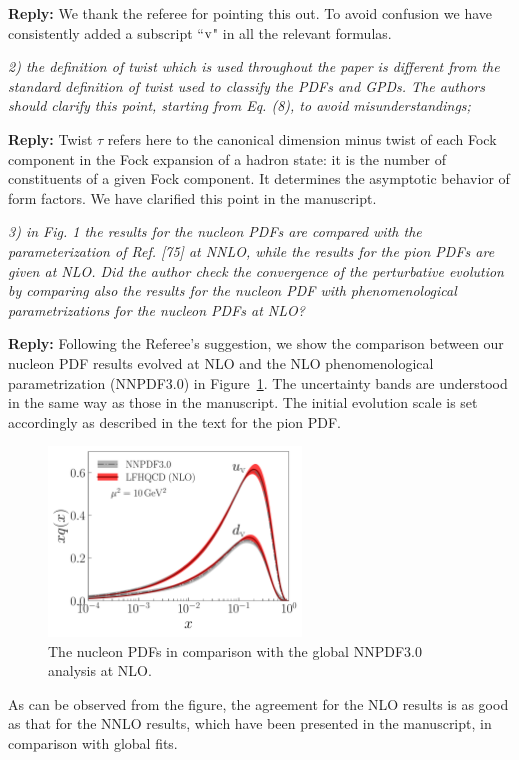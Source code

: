 \documentclass[12pt]{article}
\begin{document}
{\bf Reply:} We thank the referee for pointing this out. To avoid confusion we have consistently added a subscript  ``$\rm v$" in all the relevant formulas.


{\it 2) the definition of twist which is used throughout the paper is
different from the standard definition of twist used to classify the
PDFs and GPDs. The authors should clarify this point, starting from
Eq. (8), to avoid misunderstandings;}


{\bf Reply:}  Twist $\tau$ refers here to the canonical dimension minus twist of each Fock component in the Fock expansion of a hadron state: it is the number of constituents of a given Fock component.  It determines the asymptotic behavior of form factors. We have clarified this point in the manuscript.


{\it 3) in Fig. 1 the results for the nucleon PDFs are compared with the
parameterization of Ref. [75] at NNLO, while the results for the pion
PDFs are given at NLO. Did the author check the convergence of the
perturbative evolution by comparing also the results for the nucleon
PDF with phenomenological parametrizations for the nucleon PDFs at
NLO?}

{\bf Reply:} Following the Referee's suggestion, we show the comparison between our nucleon PDF results evolved at NLO and the NLO phenomenological parametrization (NNPDF3.0) in Figure~\ref{proton_nlo}. The uncertainty bands are understood in the same way as those in the manuscript. The initial evolution scale is set accordingly as described in the text for the pion PDF.

\begin{figure}[!h]
\centering
\includegraphics[width=0.6\textwidth]{proton-NLO-xf.pdf}
\caption{The nucleon PDFs in comparison with the global  NNPDF3.0 analysis at NLO.\label{proton_nlo}}
\end{figure}

As can be observed from the figure, the agreement for the NLO results is as good as that for the NNLO results, which have been presented in the manuscript, in comparison with global fits. 
\end{document}
